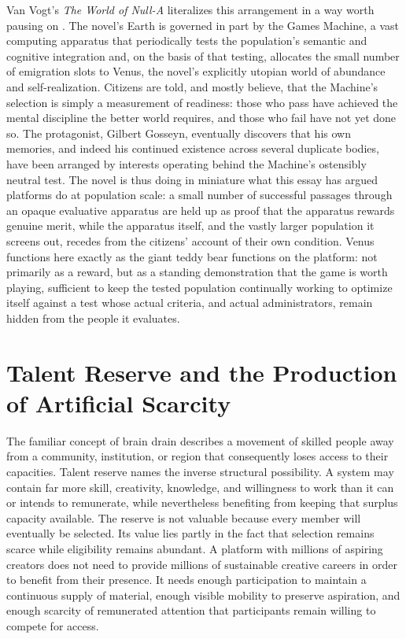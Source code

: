 \documentclass[11pt]{article}
\begin{document}
Van Vogt's \emph{The World of Null-A} literalizes this arrangement in a way worth pausing on \parencite{vanvogt1945worldofnulla}. The novel's Earth is governed in part by the Games Machine, a vast computing apparatus that periodically tests the population's semantic and cognitive integration and, on the basis of that testing, allocates the small number of emigration slots to Venus, the novel's explicitly utopian world of abundance and self-realization. Citizens are told, and mostly believe, that the Machine's selection is simply a measurement of readiness: those who pass have achieved the mental discipline the better world requires, and those who fail have not yet done so. The protagonist, Gilbert Gosseyn, eventually discovers that his own memories, and indeed his continued existence across several duplicate bodies, have been arranged by interests operating behind the Machine's ostensibly neutral test. The novel is thus doing in miniature what this essay has argued platforms do at population scale: a small number of successful passages through an opaque evaluative apparatus are held up as proof that the apparatus rewards genuine merit, while the apparatus itself, and the vastly larger population it screens out, recedes from the citizens' account of their own condition. Venus functions here exactly as the giant teddy bear functions on the platform: not primarily as a reward, but as a standing demonstration that the game is worth playing, sufficient to keep the tested population continually working to optimize itself against a test whose actual criteria, and actual administrators, remain hidden from the people it evaluates.

\section{Talent Reserve and the Production of Artificial Scarcity}

The familiar concept of brain drain describes a movement of skilled people away from a community, institution, or region that consequently loses access to their capacities. Talent reserve names the inverse structural possibility. A system may contain far more skill, creativity, knowledge, and willingness to work than it can or intends to remunerate, while nevertheless benefiting from keeping that surplus capacity available. The reserve is not valuable because every member will eventually be selected. Its value lies partly in the fact that selection remains scarce while eligibility remains abundant. A platform with millions of aspiring creators does not need to provide millions of sustainable creative careers in order to benefit from their presence. It needs enough participation to maintain a continuous supply of material, enough visible mobility to preserve aspiration, and enough scarcity of remunerated attention that participants remain willing to compete for access.
\end{document}
